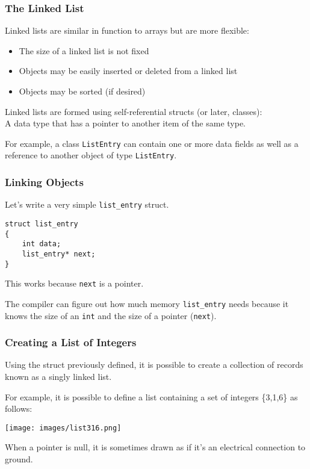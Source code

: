 \begin{frame}
\frametitle{The Linked List}

Linked lists are similar in function to arrays but are more flexible:
\begin{itemize}
    \item The size of a linked list is not fixed
    \item Objects may be easily inserted or deleted from a linked list
    \item Objects may be sorted (if desired)
\end{itemize}

Linked lists are formed using self-referential structs (or later, classes):\\
\quad A data type that has a pointer to another item of the same type.

For example, a class \texttt{ListEntry} can contain one or more data fields as well as a reference to another object of type \texttt{ListEntry}.

\end{frame}


\begin{frame}[fragile]
\frametitle{Linking Objects}

Let's write a very simple \texttt{list\_entry} struct.

\begin{verbatim}
struct list_entry
{
    int data;
    list_entry* next;
}
\end{verbatim}

This works because \texttt{next} is a pointer.

The compiler can figure out how much memory \texttt{list\_entry} needs because it knows the size of an \texttt{int} and the size of a pointer (\texttt{next}).

\end{frame}

\begin{frame}
\frametitle{Creating a List of Integers}

Using the struct previously defined, it is possible to create a collection of records known as a singly linked list.

For example, it is possible to define a list containing a set of integers \{3,1,6\} as follows:

\begin{center}
    \texttt{[image: images/list316.png]}
\end{center}

When a pointer is null, it is sometimes drawn as if it's an electrical connection to ground.

\end{frame}

